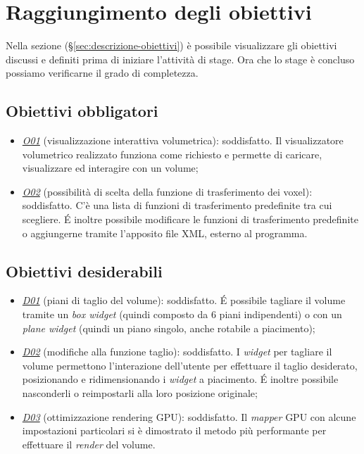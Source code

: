 \section{Raggiungimento degli obiettivi}
Nella sezione  (§\ref{sec:descrizione-obiettivi}) è possibile visualizzare gli obiettivi discussi e definiti prima di iniziare l'attività di stage. Ora che lo stage è concluso possiamo verificarne il grado di completezza.

\subsection{Obiettivi obbligatori}
\begin{itemize}
\item \underline{\textit{O01}} (visualizzazione interattiva volumetrica): soddisfatto. Il visualizzatore volumetrico realizzato funziona come richiesto e permette di caricare, visualizzare ed interagire con un volume;
\item \underline{\textit{O02}} (possibilità di scelta della funzione di trasferimento dei voxel): soddisfatto. C'è una lista di funzioni di trasferimento predefinite tra cui scegliere. \'E inoltre possibile modificare le funzioni di trasferimento predefinite o aggiungerne tramite l'apposito file XML, esterno al programma.
\end{itemize}

\subsection{Obiettivi desiderabili}
\begin{itemize}
\item \underline{\textit{D01}} (piani di taglio del volume): soddisfatto. \'E possibile tagliare il volume tramite un \emph{box widget} (quindi composto da 6 piani indipendenti) o con un \emph{plane widget} (quindi un piano singolo, anche rotabile a piacimento);
\item \underline{\textit{D02}} (modifiche alla funzione taglio): soddisfatto. I \emph{widget} per tagliare il volume permettono l'interazione dell'utente per effettuare il taglio desiderato, posizionando e ridimensionando i \emph{widget} a piacimento. \'E inoltre possibile nasconderli o reimpostarli alla loro posizione originale;
\item \underline{\textit{D03}} (ottimizzazione rendering GPU): soddisfatto. Il \emph{mapper} GPU con alcune impostazioni particolari si è dimostrato il metodo più performante per effettuare il \emph{render} del volume.
\end{itemize}

